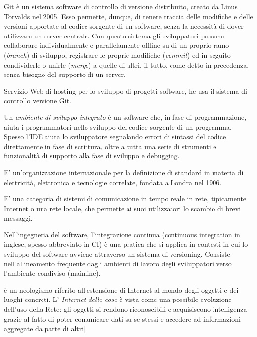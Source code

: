 \documentclass{scalatekids-article}
\begin{document}

 Git è un sistema software di controllo di versione distribuito, creato da Linus Torvalds nel 2005.
Esso permette, dunque, di tenere traccia delle modifiche e delle versioni apportate al codice sorgente di un software, senza la necessità di dover utilizzare un server centrale.
Con questo sistema gli sviluppatori possono collaborare individualmente e parallelamente offline su di un proprio ramo (\textit{branch}) di sviluppo, registrare le proprie modifiche (\textit{commit}) ed in seguito condividerle o unirle (\textit{merge}) a quelle di altri, il tutto, come detto in precedenza, senza bisogno del supporto di un server.

 Servizio Web di hosting per lo sviluppo di progetti software, he usa il sistema di controllo  versione Git.



 Un \textit{ambiente di sviluppo integrato} è un software che, in fase di programmazione, aiuta i programmatori nello sviluppo del codice sorgente di un programma. Spesso l'IDE aiuta lo sviluppatore segnalando errori di sintassi del codice direttamente in fase di scrittura, oltre a tutta una serie di strumenti e funzionalità di supporto alla fase di sviluppo e debugging.

 E' un'organizzazione internazionale per la definizione di standard in materia di elettricità, elettronica e tecnologie correlate, fondata a Londra nel 1906.

 E' una categoria di sistemi di comunicazione in tempo reale in rete, tipicamente Internet o una rete locale, che permette ai suoi utilizzatori lo scambio di brevi messaggi.

 Nell'ingegneria del software, l'integrazione continua (continuous integration in inglese, spesso abbreviato in CI) è una pratica che si applica in contesti in cui lo sviluppo del software avviene attraverso un sistema di versioning. Consiste nell'allineamento frequente dagli ambienti di lavoro degli sviluppatori verso l'ambiente condiviso (mainline).

 è un neologismo riferito all'estensione di Internet al mondo degli oggetti e dei luoghi concreti.
L' \textit{Internet delle cose} è vista come una possibile evoluzione dell'uso della Rete: gli oggetti si rendono riconoscibili e acquisiscono intelligenza grazie al fatto di poter comunicare dati su se stessi e accedere ad informazioni aggregate da parte di altri[
\end{document}
